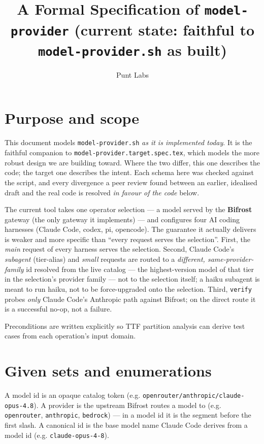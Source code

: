 \documentclass{article}
\begin{document}
\title{A Formal Specification of \texttt{model-provider} (current state: faithful to \texttt{model-provider.sh} as built)}
\author{Punt Labs}
\maketitle

\section{Purpose and scope}

This document models \texttt{model-provider.sh} \emph{as it is implemented
today}. It is the faithful companion to \texttt{model-provider.target.spec.tex},
which models the more robust design we are building toward. Where the two
differ, this one describes the code; the target one describes the intent. Each
schema here was checked against the script, and every divergence a peer review
found between an earlier, idealised draft and the real code is resolved \emph{in
favour of the code} below.

The current tool takes one operator selection --- a model served by the
\textbf{Bifrost} gateway (the only gateway it implements) --- and configures
four AI coding harnesses (Claude Code, codex, pi, opencode). The guarantee it
actually delivers is weaker and more specific than ``every request serves the
selection''. First, the \emph{main} request of every harness serves the
selection. Second, Claude Code's \emph{subagent} (tier-alias) and \emph{small}
requests are routed to a \emph{different, same-provider-family} id resolved from
the live catalog --- the highest-version model of that tier in the selection's
provider family --- not to the selection itself; a haiku subagent is meant to
run haiku, not to be force-upgraded onto the selection. Third, \texttt{verify}
probes \emph{only} Claude Code's Anthropic path against Bifrost; on the direct
route it is a successful no-op, not a failure.

Preconditions are written explicitly so TTF partition analysis can derive test
cases from each operation's input domain.

\section{Given sets and enumerations}

A model id is an opaque catalog token (e.g.
\texttt{openrouter/anthropic/claude-opus-4.8}). A provider is the upstream
Bifrost routes a model to (e.g. \texttt{openrouter}, \texttt{anthropic},
\texttt{bedrock}) --- in a model id it is the segment before the first slash. A
canonical id is the base model name Claude Code derives from a model id (e.g.
\texttt{claude-opus-4-8}).
\end{document}
